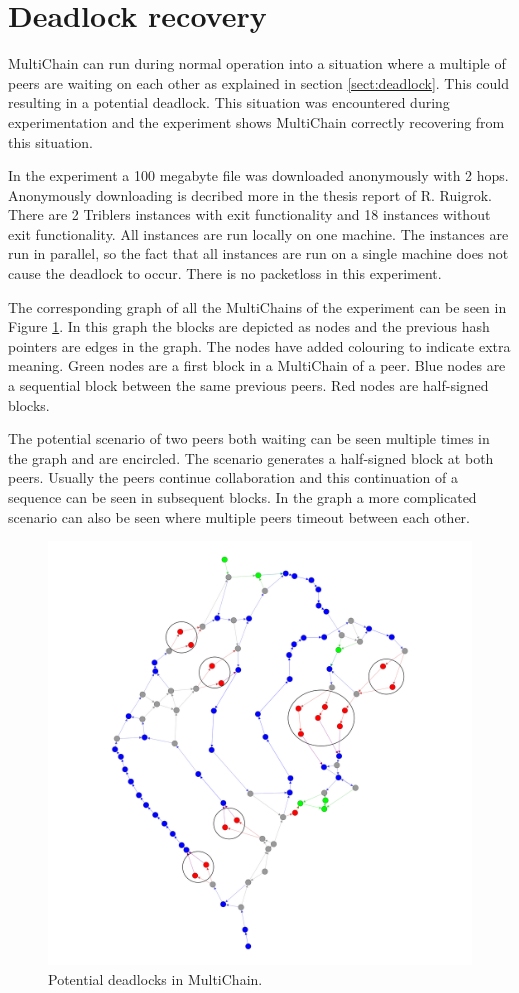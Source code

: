 \section{Deadlock recovery}
\label{sect:deadlock-exp}
MultiChain can run during normal operation into a situation
where a multiple of peers are waiting on each other as explained in section \ref{sect:deadlock}.
This could resulting in a potential deadlock.
This situation was encountered during experimentation
and the experiment shows MultiChain correctly recovering from this situation.

In the experiment a 100 megabyte file was downloaded anonymously with 2 hops.
Anonymously downloading is decribed more in the thesis report of R. Ruigrok\cite{ruigrok-anonymous}.
There are 2 Triblers instances with exit functionality and 18 instances without exit functionality.
All instances are run locally on one machine.
The instances are run in parallel,
so the fact that all instances are run on a single machine does not cause the deadlock to occur.
There is no packetloss in this experiment.

The corresponding graph of all the MultiChains of the experiment can be seen in Figure \ref{fig:deadlock-double}.
In this graph the blocks are depicted as nodes and the previous hash pointers are edges in the graph.
The nodes have added colouring to indicate extra meaning.
Green nodes are a first block in a MultiChain of a peer.
Blue nodes are a sequential block between the same previous peers.
Red nodes are half-signed blocks.

The potential scenario of two peers both waiting can be seen multiple times in the graph and are encircled.
The scenario generates a half-signed block at both peers.
Usually the peers continue collaboration and this continuation of a sequence can be seen in subsequent blocks.
In the graph a more complicated scenario can also be seen where multiple peers timeout between each other.

\begin{figure}
	\centerline{\includegraphics[scale=0.0375]{experimentation/deadlock/deadlock.png}}
	\caption{Potential deadlocks in MultiChain.}
	\label{fig:deadlock-double}
\end{figure}